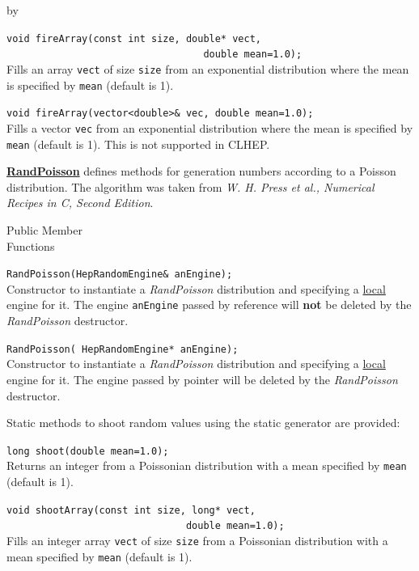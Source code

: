 \documentclass[twoside]{article}
\newcommand{\comp}[1]{\texttt{#1}}%
\newcommand{\entrylabel}[1]{\mbox{\textbf{{#1}}}\hfil}%
\newenvironment{entry}
{\begin{list}{}%
    {\renewcommand{\makelabel}{\entrylabel}%
     \setlength{\labelwidth}{90pt}%
     \setlength{\leftmargin}{\labelwidth}
     \advance\leftmargin by \labelsep%
      }%
    }%
  {\end{list}}
\newcommand{\Entrylabel}[1]%
{\raisebox{0pt}[1ex][0pt]{\makebox[\labelwidth][l]%
    {\parbox[t]{\labelwidth}{\hspace{0pt}\textbf{{#1}}}}}}
\newenvironment{Entry}%
{\renewcommand{\entrylabel}{\Entrylabel}\begin{entry}}%
  {\end{entry}}
\begin{document}
\begin{description}
\begin{Entry}
   \verb+void fireArray(const int size, double* vect,+\\
   \verb+                                  double mean=1.0);+\\
   Fills an array \comp{vect} of size \comp{size} from an exponential distribution
   where the mean is specified by \comp{mean} (default is 1).

   \verb+void fireArray(vector<double>& vec, double mean=1.0);+\\
   Fills a vector \comp{vec} from an exponential distribution
   where the mean is specified by \comp{mean} (default is 1).
   This is not supported in CLHEP.

   \begin{description}
     \item \underline{\bf RandPoisson}  defines methods for generation numbers
       according to a Poisson distribution.  The algorithm was taken
       from {\em W. H. Press et al., Numerical Recipes in C, Second Edition}.
   \end{description}
   
\item[Public Member\\ Functions]

    \verb+RandPoisson(HepRandomEngine& anEngine);+\\
    Constructor to instantiate a {\em RandPoisson}
    distribution and specifying a \underline{local} engine for it.
    The engine \comp{anEngine} passed by reference will {\bf not}
    be deleted by the {\em RandPoisson} destructor.
  
    \verb+RandPoisson( HepRandomEngine* anEngine);+\\
    Constructor to instantiate a {\em RandPoisson}
    distribution and specifying a \underline{local} engine for it.
    The engine passed by pointer will be deleted by the {\em RandPoisson}
    destructor.

    Static methods to shoot random values using the static generator
    are provided:

    \verb+long shoot(double mean=1.0);+\\
    Returns an integer from a Poissonian distribution with a mean
    specified by \comp{mean} (default is 1).

    \verb+void shootArray(const int size, long* vect,+\\
    \verb+                               double mean=1.0);+\\
    Fills an integer array \comp{vect} of size \comp{size} from a
    Poissonian distribution with a mean specified by \comp{mean}
    (default is 1).


\end{Entry}
\end{description}
\end{document}

